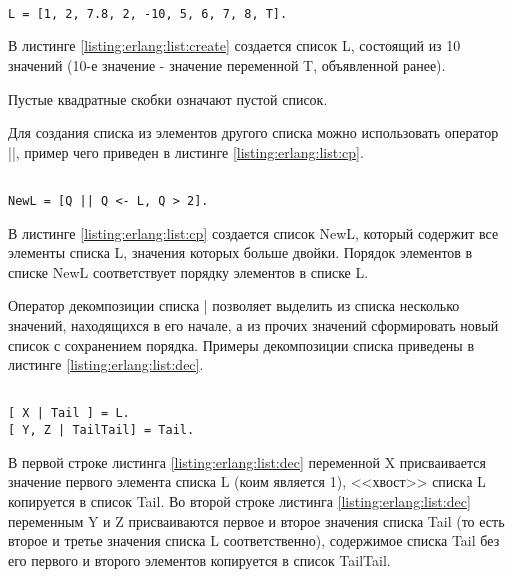 \begin{itemize}
\begin{lstlisting}

L = [1, 2, 7.8, 2, -10, 5, 6, 7, 8, T].

\end{lstlisting}
\mylistingend

		В листинге \ref{listing:erlang:list:create} создается список L, состоящий из 10 значений (10-е значение - значение переменной T, объявленной ранее).

		Пустые квадратные скобки означают пустой список.

		Для создания списка из элементов другого списка можно использовать оператор ||, пример чего приведен в листинге \ref{listing:erlang:list:cp}.

\begin{lstlisting}

NewL = [Q || Q <- L, Q > 2].

\end{lstlisting}
\mylistingend

		В листинге \ref{listing:erlang:list:cp} создается список NewL, который содержит все элементы списка L, значения которых больше двойки. Порядок элементов в списке NewL соответствует порядку элементов в списке L.

		Оператор декомпозиции списка | позволяет выделить из списка несколько значений, находящихся в его начале, а из прочих значений сформировать новый список с сохранением порядка. Примеры декомпозиции списка приведены в листинге \ref{listing:erlang:list:dec}.

\begin{lstlisting}

[ X | Tail ] = L.
[ Y, Z | TailTail] = Tail.

\end{lstlisting}
\mylistingend

\end{itemize}

		В первой строке листинга \ref{listing:erlang:list:dec} переменной X присваивается значение первого элемента списка L (коим является 1), <<хвост>> списка L копируется в список Tail. Во второй строке листинга \ref{listing:erlang:list:dec} переменным Y и Z присваиваются первое и второе значения списка Tail (то есть второе и третье значения списка L соответственно), содержимое списка Tail без его первого и второго элементов копируется в список TailTail.

